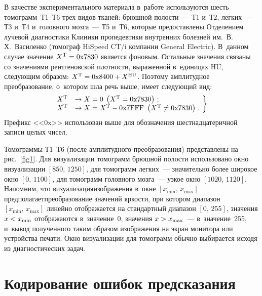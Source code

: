 \begin{multicols}{2}
В качестве экспериментального материала в~работе используются шесть 
томограмм~Т1--Т6 трех видов тканей: брюшной полости~--- Т1 и~Т2, легких~---
Т3 и~Т4 и~головного мозга~--- Т5 и~Т6, которые предоставлены Отделением лучевой 
диагностики Клиники пропедевтики внутренних болезней им.\
 В.\,Х.~Василенко (томограф HiSpeed CT/i компании General Electric). 
 В~данном случае значение $X^{\mathrm{T}}\hm=0\mathrm{x}7830$ является 
 фоновым. Остальные значения   связаны со значениями рентгеновской плот\-ности, 
 выраженной в~единицах HU, следующим образом: 
 $X^{\mathrm{T}}\hm=0\mathrm{x}8400\hm+ X^{\mathrm{HU}}$. 
 Поэтому амплитудное преобразование, о~котором шла речь выше, имеет сле\-ду\-ющий вид:
\begin{equation}
\left.
\begin{array}{rl}
\hspace*{-2mm}X^{\mathrm{T}} &\to X=0 \; \left(X^{\mathrm{T}}=0\mathrm{x}7830\right)\,; \\
\hspace*{-2mm}X^{\mathrm{T}} &\to X=X^{\mathrm{T}}-0\mathrm{x}7\mathrm{FFF}\  
\left(X^{\mathrm{T}}\neq 0\mathrm{x}7830\right)\,.
\end{array}\!
\right\}\!
\label{eq21}
\end{equation}
Префикс <<$0{\mathrm{x}}$>> использован выше для обозначения шестнадцатеричной 
записи целых чисел.

Томограммы Т1--Т6 (после амплитудного преобразова\-ния) представлены на 
рис.~\ref{fig1}. Для визу\-а\-лизации томограмм брюшной полости использовано 
окно визуализации $[850,\, 1250]$, для томограмм легких~--- 
значительно более широкое окно $[0,\,1100]$, для томограмм головного мозга~--- 
узкое окно $[1020,\,1120]$. Напомним, что визуализация\linebreak изображения 
в~окне $[x_{\min},\,x_{\max}]$ предполагает\linebreak преобразование значений яркости, 
при котором диапазон $[x_{\min},\,x_{\max}]$ линейно отображается на 
стандартный диапазон $[0,\,255]$, значения $x \hm< x_{\min}$ 
отоб\-ра\-жа\-ют\-ся в~значение~0, значения $x\hm> x_{\max}$~--- 
в~значение~255, и~вывод полученного таким образом изображения на экран монитора 
или устройства печати. Окно визуализации для томограмм обычно выбирается исходя 
из диагностических задач.

\vspace*{-6pt}


\section{Кодирование ошибок предсказания}


\end{multicols}
